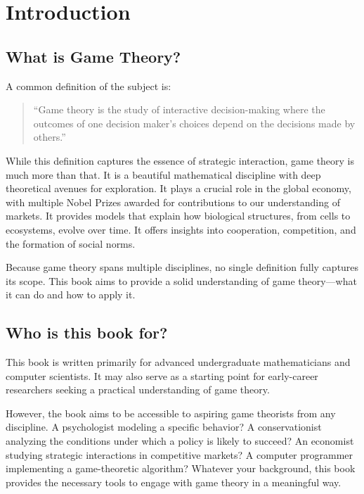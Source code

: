 \chapter{Introduction}
\label{chapter:introduction}

\section{What is Game Theory?}

A common definition of the subject is:

\begin{quote} 
``Game theory is the study of interactive decision-making where
the outcomes of one decision maker’s choices depend on the decisions made by
others.'' 
\end{quote}

While this definition captures the essence of strategic interaction, game theory
is much more than that. It is a beautiful mathematical discipline with deep
theoretical avenues for exploration. It plays a crucial role in the global
economy, with multiple Nobel Prizes awarded for contributions to our
understanding of markets. It provides models that explain how biological
structures, from cells to ecosystems, evolve over time. It offers insights into
cooperation, competition, and the formation of social norms.

Because game theory spans multiple disciplines, no single definition fully
captures its scope. This book aims to provide a solid understanding of game
theory—what it can do and how to apply it.

\section{Who is this book for?}

This book is written primarily for advanced undergraduate mathematicians and
computer scientists. It may also serve as a starting point for early-career
researchers seeking a practical understanding of game theory.  

However, the book aims to be accessible to aspiring game theorists from any
discipline. A psychologist modeling a specific behavior? A conservationist
analyzing the conditions under which a policy is likely to succeed? An economist
studying strategic interactions in competitive markets? A computer programmer
implementing a game-theoretic algorithm? Whatever your background, this book
provides the necessary tools to engage with game theory in a meaningful way.  


